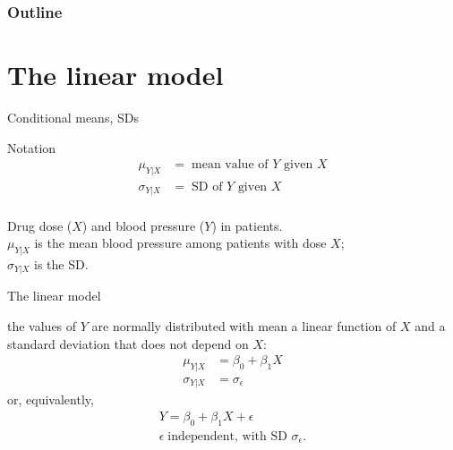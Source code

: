 %
%
%



\subtitle{confidence intervals, outliers, and leverage}

\date{5 December 2013}





\begin{frame}
  \maketitle
\end{frame}


\begin{frame}\frametitle<presentation>{Outline}
  \tableofcontents
\end{frame}


\section{The linear model}

\begin{frame}{Conditional means, SDs}

  \begin{block}{Notation}
    \begin{align*}
      \mu_{Y|X} &= \; \text{mean value of $Y$ given $X$} \\
      \sigma_{Y|X} &= \; \text{SD of $Y$ given $X$} \\
    \end{align*}
  \end{block}


    \vspace{2em}

    Drug dose ($X$) and blood pressure ($Y$) in patients. \\
    $\mu_{Y|X}$ is the mean blood pressure among patients with dose $X$; \\
    $\sigma_{Y|X}$ is the SD.

\end{frame}

\begin{frame}{The linear model}

   the values of $Y$ are normally distributed with mean
  a linear function of $X$ and a standard deviation that does not depend on $X$:
  \begin{align*}
    \mu_{Y|X} &= \beta_0 + \beta_1 X \\
    \sigma_{Y|X} &= \sigma_\epsilon
  \end{align*}
  or, equivalently,
  \begin{align*}
    Y = \beta_0 + \beta_1 X + \epsilon \\
    \epsilon \; \text{independent, with SD $\sigma_\epsilon$} .
  \end{align*}

\end{frame}


